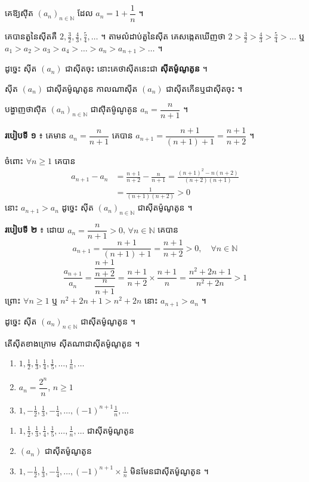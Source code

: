 \begin{example}[ឧទាហរណ៍ ២]
គេឱ្យស៊ីត $(a_n)_{n \in \mathbb{N}}$ ដែល $a_n = 1 + \dfrac{1}{n}$ ។

គេបានតួនៃស៊ីតគឺ $2, \frac{3}{2}, \frac{4}{3}, \frac{5}{4}, \ldots$ ។ តាមលំដាប់តួនៃស៊ីត គេសង្កេតឃើញថា $2 > \frac{3}{2} > \frac{4}{3} > \frac{5}{4} > \ldots$ ឬ $a_1 > a_2 > a_3 > a_4 > \ldots > a_n > a_{n+1} > \ldots$ ។

ដូច្នេះ ស៊ីត $(a_n)$ ជាស៊ីតចុះ នោះគេថាស៊ីតនេះជា \textbf{ស៊ីតម៉ូណូតូន} ។
\end{example}

\begin{definition}
ស៊ីត $(a_n)$ ជាស៊ីតម៉ូណូតូន កាលណាស៊ីត $(a_n)$ ជាស៊ីតកើនឬជាស៊ីតចុះ ។
\end{definition}

\begin{example}[លំហាត់គំរូ]
បង្ហាញថាស៊ីត $(a_n)_{n \in \mathbb{N}}$ ជាស៊ីតម៉ូណូតូន $a_n = \dfrac{n}{n+1}$ ។
\end{example}
\ans
\textbf{របៀបទី ១} ៖ គេមាន $a_n = \dfrac{n}{n+1}$ គេបាន $a_{n+1} = \dfrac{n+1}{(n+1)+1} = \dfrac{n+1}{n+2}$ ។

ចំពោះ $\forall n \ge 1$ គេបាន
\[
\begin{aligned} a_{n+1} - a_n &= \frac{n+1}{n+2} - \frac{n}{n+1} = \frac{(n+1)^2 - n(n+2)}{(n+2)(n+1)}\\ &= \frac{1}{(n+1)(n+2)} > 0 \end{aligned}
\]
នោះ $a_{n+1} > a_n$ ដូច្នេះ ស៊ីត $(a_n)_{n \in \mathbb{N}}$ ជាស៊ីតម៉ូណូតូន ។

\textbf{របៀបទី ២} ៖ ដោយ $a_n = \dfrac{n}{n+1} > 0$, $\forall n \in \mathbb{N}$ គេបាន
\[
a_{n+1} = \frac{n+1}{(n+1)+1} = \frac{n+1}{n+2} > 0,\quad \forall n \in \mathbb{N}
\]
\[
\frac{a_{n+1}}{a_n} = \frac{\dfrac{n+1}{n+2}}{\dfrac{n}{n+1}} = \frac{n+1}{n+2} \times \frac{n+1}{n} = \frac{n^2 + 2n + 1}{n^2 + 2n} > 1
\]
ព្រោះ $\forall n \ge 1$ ឬ $n^2 + 2n + 1 > n^2 + 2n$ នោះ $a_{n+1} > a_n$ ។

ដូច្នេះ ស៊ីត $(a_n)_{n \in \mathbb{N}}$ ជាស៊ីតម៉ូណូតូន ។

\begin{pro}
តើស៊ីតខាងក្រោម ស៊ីតណាជាស៊ីតម៉ូណូតូន ។
\begin{enumerate}[a]
  \item $1, \frac{1}{2}, \frac{1}{3}, \frac{1}{4}, \frac{1}{5}, \ldots, \frac{1}{n}, \ldots$
  \item $a_n = \dfrac{2^n}{n}$, $n \ge 1$
  \item $1, -\frac{1}{2}, \frac{1}{3}, -\frac{1}{4}, \ldots, (-1)^{n+1}\frac{1}{n}, \ldots$
\end{enumerate}
\ans
\begin{enumerate}[a]
  \item $1, \frac{1}{2}, \frac{1}{3}, \frac{1}{4}, \frac{1}{5}, \ldots, \frac{1}{n}, \ldots$ ជាស៊ីតម៉ូណូតូន
  \item $(a_n)$ ជាស៊ីតម៉ូណូតូន
  \item $1, -\frac{1}{2}, \frac{1}{3}, -\frac{1}{4}, \ldots, (-1)^{n+1} \times \frac{1}{n}$ មិនមែនជាស៊ីតម៉ូណូតូន ។
\end{enumerate}
\end{pro}

